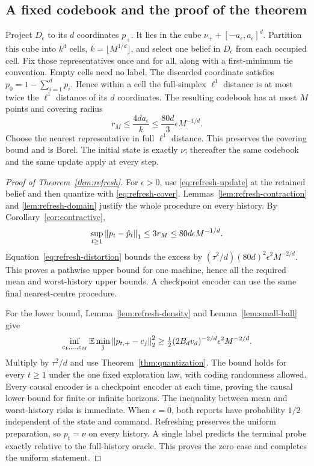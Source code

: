 \subsection{A fixed codebook and the proof of the theorem}
Project $D_\epsilon$ to its $d$ coordinates $p_+$. It lies in the cube
$\nu_++[-a_\epsilon,a_\epsilon]^d$. Partition this cube into
$k^d$ cells, $k=\lfloor M^{1/d}\rfloor$, and select one belief in
$D_\epsilon$ from each occupied cell. Fix those representatives once and
for all, along with a first-minimum tie convention. Empty cells need no
label. The discarded coordinate satisfies $p_0=1-\sum_{i=1}^dp_i$.
Hence within a cell the full-simplex $\ell^1$ distance is at most twice
the $\ell^1$ distance of its $d$ coordinates. The resulting codebook has
at most $M$ points and covering radius
\begin{equation}\label{eq:refresh-cover}
 r_M\le\frac{4da_\epsilon}{k}
 \le\frac{80d}{3}\epsilon M^{-1/d}.
\end{equation}
Choose the nearest representative in full $\ell^1$ distance. This preserves
the covering bound and is Borel. The initial state is exactly $\nu$;
thereafter the same codebook and the same update apply at every step.

\begin{proof}[Proof of Theorem~\ref{thm:refresh}]
For $\epsilon>0$, use \eqref{eq:refresh-update} at the retained belief and
then quantize with \eqref{eq:refresh-cover}. Lemmas~\ref{lem:refresh-contraction}
and \ref{lem:refresh-domain} justify the whole procedure on every history.
By Corollary~\ref{cor:contractive},
\begin{equation}\label{eq:refresh-error}
 \sup_{t\ge1}\left\lVert p_t-\hat p_t\right\rVert_1
 \le3r_M\le80d\epsilon M^{-1/d}.
\end{equation}
Equation~\eqref{eq:refresh-distortion} bounds the excess by
$(\tau^2/d)(80d)^2\epsilon^2M^{-2/d}$. This proves a pathwise upper bound
for one machine, hence all the required mean and worst-history upper bounds.
A checkpoint encoder can use the same final nearest-centre procedure.

For the lower bound, Lemma~\ref{lem:refresh-density} and
Lemma~\ref{lem:small-ball} give
\[
 \inf_{c_1,\ldots,c_M}\mathbb E\min_j\left\lVert p_{t,+}-c_j\right\rVert_2^2
 \ge \tfrac12(2B_dv_d)^{-2/d}\epsilon^2M^{-2/d}.
\]
Multiply by $\tau^2/d$ and use Theorem~\ref{thm:quantization}. The bound
holds for every $t\ge1$ under the one fixed exploration law, with coding
randomness allowed. Every causal encoder is a checkpoint encoder at each
time, proving the causal lower bound for finite or infinite horizons.
The inequality between mean and worst-history risks is immediate.
When $\epsilon=0$, both reports have probability $1/2$ independent of the
state and command. Refreshing preserves the uniform preparation, so
$p_t=\nu$ on every history. A single label predicts the terminal probe
exactly relative to the full-history oracle. This proves the zero case and
completes the uniform statement.
\end{proof}

